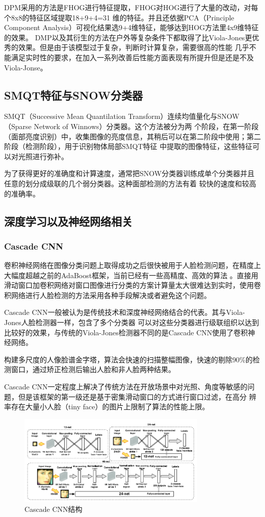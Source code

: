 \documentclass[UTF8]{ctexart}
\begin{document}
DPM采用的方法是FHOG进行特征提取\cite{mathias2014face}，FHOG对HOG进行了大量的改动，对每个8x8的特征区域提取18+9+4=31
维的特征。并且还依据PCA（Principle Component Analysis）可视化结果选9+4维特征，能够达到HOG方法里4x9维特征的效果。
DMP以及其衍生的方法在户外等复杂条件下都取得了比Viola-Jones更优秀的效果。但是由于该模型过于复杂，判断时计算复杂，需要很高的性能
几乎不能满足实时性的要求，在加入一系列改善后性能方面表现有所提升但是还是不及Viola-Jonse。
\subsection{SMQT特征与SNOW分类器}
SMQT（Successive Mean Quantilation Transform）连续均值量化与SNOW（Sparse Network of Winnows）分类器。这个方法被分为两
个阶段，在第一阶段（面部亮度识别）中，收集图像的亮度信息，其稍后可以在第二阶段中使用；第二阶段（检测阶段），用于识别物体局部SMQT特征
中提取的图像特征，这些特征可以对光照进行弥补。

为了获得更好的准确度和计算速度，通常把SNOW分类器训练成单个分类器并且任意的划分成级联的几个弱分类器。这种面部检测的方法有着
较快的速度和较高的准确率。
\subsection{深度学习以及神经网络相关}
\subsubsection{Cascade CNN}
卷积神经网络在图像分类问题上取得成功之后很快被用于人脸检测问题，在精度上大幅度超越之前的AdaBoost框架，当前已经有一些高精度、高效的算法
。直接用滑动窗口加卷积网络对窗口图像进行分类的方案计算量太大很难达到实时，使用卷积网络进行人脸检测的方法采用各种手段解决或者避免这个问题。

Cascade CNN\cite{li2015convolutional}一般被认为是传统技术和深度神经网络结合的代表。其与Viola-Jones人脸检测器一样，包含了多个分类器
可以对这些分类器进行级联组织以达到比较好的效果，与传统的Viola-Jones检测器不同的是Cascade CNN使用了卷积神经网络。

构建多尺度的人像脸谱金字塔，算法会快速的扫描整幅图像，快速的剔除90\%的检测窗口，通过矫正检测后输出人脸和非人脸两种结果。

Cascade CNN一定程度上解决了传统方法在开放场景中对光照、角度等敏感的问题，但是该框架的第一级还是基于密集滑动窗口的方式进行窗口过滤，在高分
辨率存在大量小人脸（tiny face）的图片上限制了算法的性能上限。
\begin{figure}[H]
    \centering
    \includegraphics[width=0.8\textwidth]{img/cnncascade.png}
    \caption{Cascade CNN结构}
\end{figure}
\end{document}
